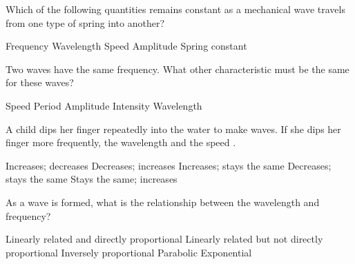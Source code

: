 \documentclass{../../oss-apphys-exam}
\begin{document}
\begin{questions}
  \question Which of the following quantities remains constant as a mechanical
  wave travels from one type of spring into another?
  \begin{choices}
    \choice Frequency
    \choice Wavelength
    \choice Speed
    \choice Amplitude
    \choice Spring constant
    \end{choices}
  \newpage
    
      
  \question Two waves have the same frequency. What other characteristic must be
  the same for these waves?
  \begin{choices}
    \choice Speed
    \choice Period
    \choice Amplitude
    \choice Intensity
    \choice Wavelength
  \end{choices}

  \question A child dips her finger repeatedly into the water to make waves. If
  she dips her finger more frequently, the wavelength \underline{\hspace{.5in}}
  and the speed \underline{\hspace{.5in}}.
  \begin{choices}
    \choice Increases; decreases
    \choice Decreases; increases
    \choice Increases; stays the same
    \choice Decreases; stays the same
    \choice Stays the same; increases
  \end{choices}
  
  \question As a wave is formed, what is the relationship between the wavelength
  and frequency?
  \begin{choices}
    \choice Linearly related and directly proportional
    \choice Linearly related but not directly proportional
    \choice Inversely proportional
    \choice Parabolic
    \choice Exponential
  \end{choices}
  


\end{questions}
\end{document}
